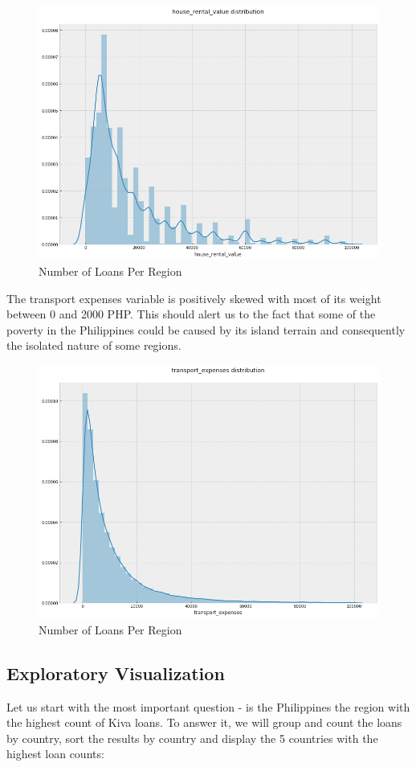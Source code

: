 \documentclass{article}
\begin{document}
\begin{figure}[H]
\caption{Number of Loans Per Region}
\centering
\includegraphics[width = 0.7 \textwidth]{house_rental_value_dist}
\end{figure}

The transport expenses variable is positively skewed with most of its weight between 0 and 2000 PHP. This should alert us to the fact that some of the poverty in the Philippines could be caused by its island terrain and consequently the isolated nature of some regions.

\begin{figure}[H]
\caption{Number of Loans Per Region}
\centering
\includegraphics[width = 0.7 \textwidth]{transport_expenses_dist}
\end{figure}

\subsection{Exploratory Visualization}
Let us start with the most important question - is the Philippines the region with the highest count of Kiva loans. To answer it, we will group and count the loans by country, sort the results by country and display the 5 countries with the highest loan counts:
\end{document}
